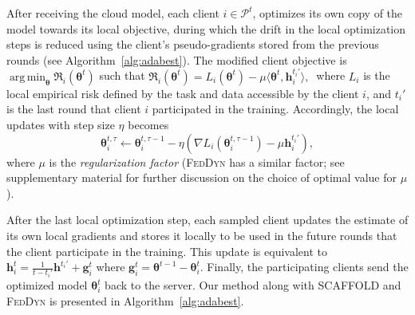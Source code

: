 \documentclass[runningheads]{llncs}
\def\algref#1{Algorithm~\ref{#1}}
\def\vtheta{{\bm{\theta}}}
\def\vg{{\bm{g}}}
\def\vh{{\bm{h}}}
\def\gP{{\mathcal{P}}}
\DeclareMathOperator*{\argmin}{arg\,min}
\newcommand{\scaffold}{\textsc{SCAFFOLD}\xspace}
\newcommand{\feddyn}{\textsc{FedDyn}\xspace}
\begin{document}
After receiving the cloud model, each client $i \in \gP^t$, optimizes its own copy of the model towards its local objective, during which the drift in the local optimization steps is reduced using the client's pseudo-gradients stored from the previous rounds (see \algref{alg:adabest}). 
The modified client objective is $\argmin_{\vtheta} \mathfrak{R}_i(\vtheta^t)$ such that 
$\mathfrak{R}_i(\vtheta^t) = L_i(\vtheta^t) - \mu \langle \vtheta^t, \vh_i^{t_i'} \rangle, \ $ where $L_i$ is the local empirical risk defined by the task and data accessible by the client $i$, and $t_i'$ is the last round that client $i$ participated in the training.
Accordingly, the local updates with step size $\eta$ becomes
\begin{equation}
    \vtheta_i^{t,\tau} \leftarrow \vtheta_i^{t,\tau-1} - \eta(\nabla L_i(\vtheta_i^{t,\tau-1})-\mu \vh_i^{t_i'}),
    \label{eq:theta_i_tau}
\end{equation}
where $\mu$ is the \emph{regularization factor} (\feddyn has a similar factor; see supplementary material for further discussion on the choice of optimal value for $\mu$).

After the last local optimization step, each sampled client updates the estimate of its own local gradients and stores it locally to be used in the future rounds that the client participate in the training.
This update is equivalent to $\vh_i^t=\frac{1}{t-t_i'} \vh^{t_i'} + \vg_i^{t}$ where $\vg_i^{t} = \vtheta^{t-1}-\vtheta_i^t$. Finally, the participating clients send the optimized model $\vtheta_i^t$ back to the server. Our method along with \scaffold and \feddyn is presented in \algref{alg:adabest}. 
\end{document}
